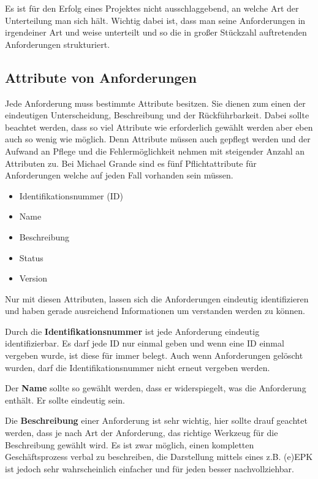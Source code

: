 Es ist für den Erfolg eines Projektes nicht ausschlaggebend, an welche Art der Unterteilung man sich hält.
Wichtig dabei ist, dass man seine Anforderungen in irgendeiner Art und weise unterteilt und so die in großer Stückzahl auftretenden Anforderungen strukturiert. 

\subsection{Attribute von Anforderungen}

Jede Anforderung muss bestimmte Attribute besitzen. Sie dienen zum einen der eindeutigen Unterscheidung, Beschreibung und der Rückführbarkeit. Dabei sollte beachtet werden, dass so viel Attribute wie erforderlich gewählt werden aber eben auch so wenig wie möglich. Denn Attribute müssen auch gepflegt werden und der Aufwand an Pflege und die Fehlermöglichkeit nehmen mit steigender Anzahl an Attributen zu.
Bei Michael Grande\autocite[40]{100minAM} sind es fünf Pflichtattribute für Anforderungen welche auf jeden Fall vorhanden sein müssen. 
\begin{itemize}
\itemsep-8pt
\item Identifikationsnummer (ID)
\item Name
\item Beschreibung
\item Status
\item Version
\end{itemize}
Nur mit diesen Attributen, lassen sich die Anforderungen eindeutig identifizieren und haben gerade ausreichend Informationen um verstanden werden zu können.


Durch die \textbf{Identifikationsnummer} ist jede Anforderung eindeutig identifizierbar. Es darf jede ID nur einmal geben und wenn eine ID einmal vergeben wurde, ist diese für immer belegt. Auch wenn Anforderungen gelöscht wurden, darf die Identifikationsnummer nicht erneut vergeben werden.

Der \textbf{Name} sollte so gewählt werden, dass er widerspiegelt, was die Anforderung enthält. Er sollte eindeutig sein.

Die \textbf{Beschreibung} einer Anforderung ist sehr wichtig, hier sollte drauf geachtet werden, dass je nach Art der Anforderung, das richtige Werkzeug für die Beschreibung gewählt wird. Es ist zwar möglich, einen kompletten Geschäftsprozess verbal zu beschreiben, die Darstellung mittels eines z.B. (e)EPK ist jedoch sehr wahrscheinlich einfacher und für jeden besser nachvollziehbar.


